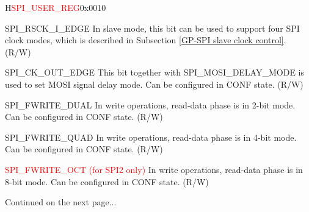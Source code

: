 \begin{register}{H}{\textcolor{red}{SPI\_USER\_REG}}{0x{}0010}
\begin{regdesc}
\begin{reglist}
\label{fielddesc:SPIRSCKIEDGE}\item [SPI\_RSCK\_I\_EDGE] In slave mode, this bit can be used to support four SPI clock modes, which is described in Subsection \ref{GP-SPI slave clock control}.  (R/W)
\label{fielddesc:SPICKOUTEDGE}\item [SPI\_CK\_OUT\_EDGE] This bit together with SPI\_MOSI\_DELAY\_MODE is used to set MOSI signal delay mode. Can be configured in CONF state. (R/W)
\label{fielddesc:SPIFWRITEDUAL}\item [SPI\_FWRITE\_DUAL] In write operations, read-data phase is in 2-bit mode. Can be configured in CONF state. (R/W)
\label{fielddesc:SPIFWRITEQUAD}\item [SPI\_FWRITE\_QUAD] In write operations, read-data phase is in 4-bit mode. Can be configured in CONF state. (R/W)
\label{fielddesc:SPIFWRITEOCT}\item [\textcolor{red}{SPI\_FWRITE\_OCT (for SPI2 only)}] In write operations, read-data phase is in 8-bit mode. Can be configured in CONF state. (R/W)

\item [Continued on the next page...]
\end{reglist}\end{regdesc}
\end{register}

